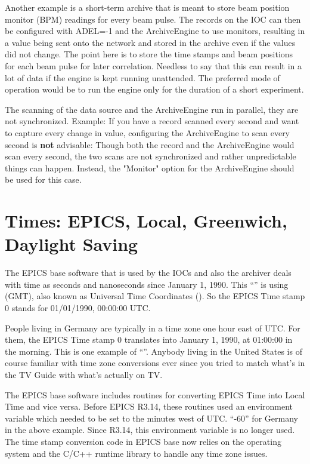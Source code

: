 Another example is a short-term archive that is meant to store
beam position monitor (BPM) readings for every beam pulse. The records
on the IOC can then be configured with ADEL=-1 and the ArchiveEngine
to use monitors, resulting in a value being sent onto the network and
stored in the archive even if the values did not change. The point
here is to store the time stamps and beam positions for each beam
pulse for later correlation. Needless to say that this can result in a
lot of data if the engine is kept running unattended. The preferred
mode of operation would be to run the engine only for the duration
of a short experiment.

\NOTE The scanning of the data source and the ArchiveEngine run in
parallel, they are not synchronized.
Example: If you have a record scanned every second and want to capture
every change in value, configuring the ArchiveEngine to scan every
second is {\bfseries not} advisable:
Though both the record and the ArchiveEngine would scan every
second, the two scans are not synchronized and rather unpredictable
things can happen. Instead, the "Monitor" option for the ArchiveEngine
should be used for this case.

\section{Times: EPICS, Local, Greenwich, Daylight Saving} \label{sec:GMT}
The EPICS base software that is used by the IOCs and also the archiver
deals with time as seconds and nanoseconds since January 1, 1990.  This
``'' is using  (GMT),
also known as Universal Time Coordinates ().  So the EPICS
Time stamp 0 stands for 01/01/1990, 00:00:00 UTC.

People living in Germany are typically in a time zone one hour east of
UTC. For them, the EPICS Time stamp 0 translates into January 1, 1990,
at 01:00:00 in the morning. This is one example of ``''. Anybody living in the United States is of course familiar
with time zone conversions ever since you tried to match what's in the
TV Guide with what's actually on TV.

The EPICS base software includes routines for converting EPICS Time
into Local Time and vice versa. Before EPICS R3.14, these routines
used an environment variable  which needed
to be set to the minutes west of UTC. ``-60'' for Germany in the above
example. Since R3.14, this environment variable is no longer
used. The time stamp conversion code in EPICS base now relies on the
operating system and the C/C++ runtime library to handle any time zone
issues.

